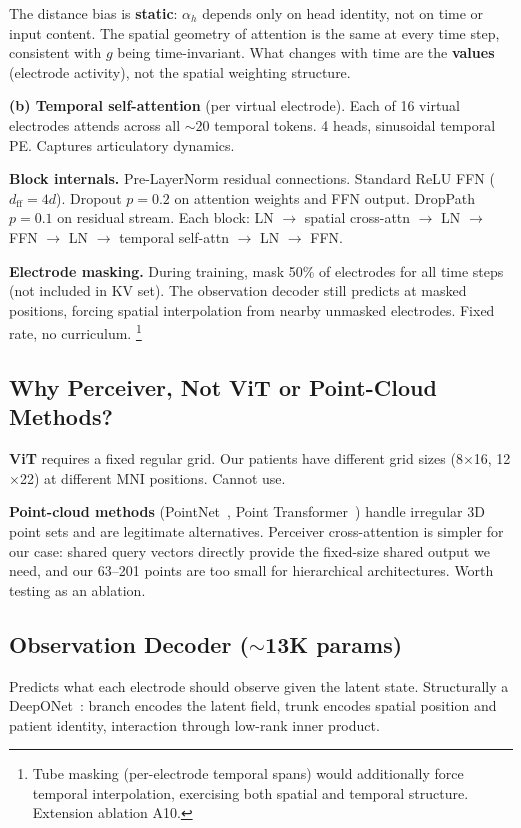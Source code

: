 \documentclass[11pt,letterpaper]{article}
\begin{document}
The distance bias is \textbf{static}: $\alpha_h$ depends only on head identity, not on time or input content. The spatial geometry of attention is the same at every time step, consistent with $g$ being time-invariant. What changes with time are the \textbf{values} (electrode activity), not the spatial weighting structure.

\textbf{(b) Temporal self-attention} (per virtual electrode). Each of 16 virtual electrodes attends across all ${\sim}20$ temporal tokens. 4 heads, sinusoidal temporal PE. Captures articulatory dynamics.

\textbf{Block internals.} Pre-LayerNorm residual connections. Standard ReLU FFN ($d_{\text{ff}} = 4d$). Dropout $p{=}0.2$ on attention weights and FFN output. DropPath $p{=}0.1$ on residual stream. Each block: LN $\to$ spatial cross-attn $\to$ LN $\to$ FFN $\to$ LN $\to$ temporal self-attn $\to$ LN $\to$ FFN.

\textbf{Electrode masking.} During training, mask 50\% of electrodes for all time steps (not included in KV set). The observation decoder still predicts at masked positions, forcing spatial interpolation from nearby unmasked electrodes. Fixed rate, no curriculum.%
\footnote{Tube masking (per-electrode temporal spans) would additionally force temporal interpolation, exercising both spatial and temporal structure. Extension ablation A10.}


\subsection{Why Perceiver, Not ViT or Point-Cloud Methods?}

\textbf{ViT} requires a fixed regular grid. Our patients have different grid sizes (8$\times$16, 12$\times$22) at different MNI positions. Cannot use.

\textbf{Point-cloud methods} (PointNet~\cite{qi2017}, Point Transformer~\cite{zhao2021}) handle irregular 3D point sets and are legitimate alternatives. Perceiver cross-attention is simpler for our case: shared query vectors directly provide the fixed-size shared output we need, and our 63--201 points are too small for hierarchical architectures. Worth testing as an ablation.


\subsection{Observation Decoder (${\sim}$13K params)}\label{sec:obs-decoder}

Predicts what each electrode should observe given the latent state. Structurally a DeepONet~\cite{lu2021}: branch encodes the latent field, trunk encodes spatial position and patient identity, interaction through low-rank inner product.
\end{document}
